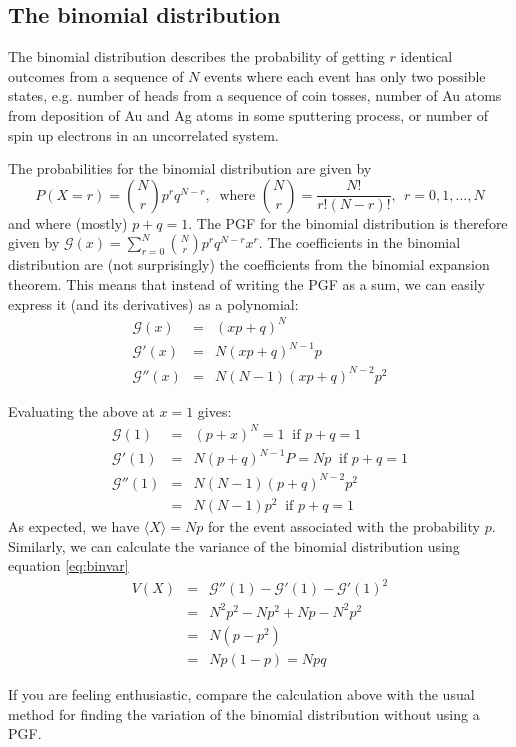 \documentclass{article}
\newcommand{\calG}{\mathcal{G}}
\begin{document}
\subsection{The binomial distribution}
The binomial distribution describes the probability of getting $r$ identical outcomes from a sequence of $N$ events where each event has only two possible states, e.g. number of heads from a sequence of coin tosses, number of Au atoms from deposition of Au and Ag atoms in some sputtering process, or number of spin up electrons in an uncorrelated system.

The probabilities for the binomial distribution are given by
$$P(X=r) = \binom{N}{r}p^rq^{N-r}, ~\text{ where } \binom{N}{r} = \frac{N!}{r!(N-r)!}, ~~r=0,1,\ldots,N$$
and where (mostly) $p+q=1$.
The PGF for the binomial distribution is therefore given by $\calG(x) = \sum_{r=0}^N\binom{N}{r}p^rq^{N-r}x^r$. 
The coefficients in the binomial distribution are (not surprisingly) the coefficients from the  binomial expansion theorem. This means that instead of writing the PGF as a sum, we can easily express it (and its derivatives) as a polynomial:
\begin{eqnarray*}
	\calG(x)  &=& (xp +q)^N \\
	\calG'(x) &=& N(xp+q)^{N-1}p\\
	\calG''(x) &=& N(N-1)(xp+q)^{N-2}p^2
\end{eqnarray*}

Evaluating the above at $x=1$ gives:
	\begin{eqnarray*}
	\calG(1) &=& (p+x)^N = 1 ~\text{ if } p+q=1\\
	\calG'(1) &=& N(p+q)^{N-1}P = Np  ~\text{ if } p+q=1\\
	\calG''(1) &=& N(N-1)(p+q)^{N-2}p^2 \\
		&=&N(N-1)p^2  ~\text{ if } p+q=1
\end{eqnarray*}
As expected, we have $\langle X\rangle =Np$ for the event associated with the probability $p$.
Similarly, we can calculate the variance of the binomial distribution using equation \ref{eq:binvar}
\begin{eqnarray*}
	V(X) &=&\calG''(1) - \calG'(1) -\calG'(1)^2\\
		&=& N^2p^2-Np^2+Np-N^2p^2\\
		&=& N(p-p^2)\\
		&=& Np(1-p)= Npq
\end{eqnarray*}

If you are feeling enthusiastic, compare the calculation above with the usual method for finding the variation of the binomial distribution without using a PGF.
\end{document}
